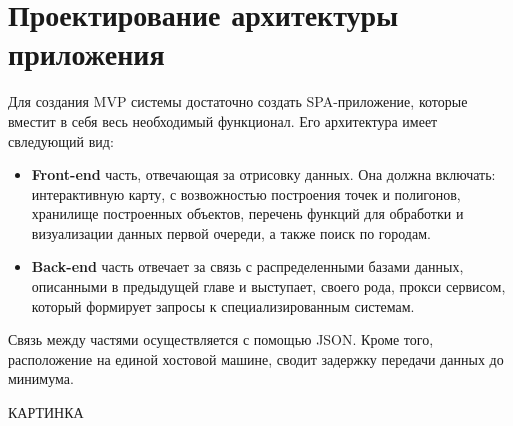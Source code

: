 \chapter{Проектирование архитектуры приложения}
Для создания MVP системы достаточно создать SPA-приложение, которые вместит в себя весь необходимый функционал.
Его архитектура имеет свледующий вид:
\begin{itemize}
	\item \textbf{Front-end} часть, отвечающая за отрисовку данных. Она должна включать: интерактивную карту, с возвожностью построения точек и полигонов, хранилище построенных объектов, перечень функций для обработки и визуализации данных первой очереди, а также поиск по городам.
	\item \textbf{Back-end} часть отвечает за связь с распределенными базами данных, описанными в предыдущей главе и выступает, своего рода, прокси сервисом, который формирует запросы к специализированным системам.
\end{itemize}

Связь между частями осуществляется с помощью JSON. Кроме того, расположение на единой хостовой машине, сводит задержку передачи данных до минимума.

КАРТИНКА